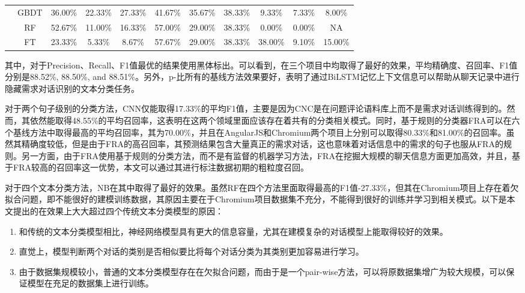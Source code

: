 \begin{table}[htb]
\begin{tabular}{|c|c|c|c|c|c|c|c|c|c|c|}
                                     & GBDT      & 36.00\%          & 22.33\%          & 27.33\%          & 41.67\%          & 35.67\%          & 38.33\%          & 9.33\%           & 7.33\%           & 8.00\%           \\ \cline{2-11} 
                                     & RF        & 52.67\%          & 11.00\%          & 16.33\%          & 57.00\%          & 29.00\%          & 38.33\%          & 0.00\%           & 0.00\%           & NA               \\ \cline{2-11} 
                                     & FT        & 23.33\%          & 5.33\%           & 8.67\%           & 57.67\%          & 29.00\%          & 38.33\%          & 38.00\%          & 9.10\%           & 15.00\%          \\ \hline
\end{tabular}
\end{table}

其中，对于Precision、Recall、F1值最优的结果使用黑体标出。可以看到，{\tool}在三个项目中均取得了最好的效果，平均精确度、召回率、F1值分别是88.52\%, 88.50\%, and 88.51\%。另外，p-{\tool}比所有的基线方法效果要好，表明了通过BiLSTM记忆上下文信息可以帮助从聊天记录中进行隐藏需求对话识别的文本分类任务。

对于两个句子级别的分类方法，CNN仅能取得17.33\%的平均F1值，主要是因为CNC是在问题评论语料库上而不是需求对话训练得到的。然而，其依然能取得48.55\%的平均召回率，这表明在这两个领域里面应该存在着共有的分类相关模式。同时，基于规则的分类器FRA可以在六个基线方法中取得最高的平均召回率，其为70.00\%，并且在AngularJS和Chromium两个项目上分别可以取得80.33\%和81.00\%的召回率。虽然其精确度较低，但是由于FRA的高召回率，其预测结果包含大量真正的需求对话，这也意味着对话信息中的需求的句子也服从FRA的规则。另一方面，由于FRA使用基于规则的分类方法，而不是有监督的机器学习方法，FRA在挖掘大规模的聊天信息方面更加高效，并且，基于FRA较高的召回率这一优势，本文可以通过其进行标注数据初期的粗粒度召回。

对于四个文本分类方法，NB在其中取得了最好的效果。虽然RF在四个方法里面取得最高的F1值-27.33\%，但其在Chromium项目上存在着欠拟合问题，即不能很好的建模训练数据，其原因主要在于Chromium项目数据集不充分，不能得到很好的训练并学习到相关模式。以下是本文提出的{\tool}在效果上大大超过四个传统文本分类模型的原因：
\begin{enumerate}
    \item 和传统的文本分类模型相比，神经网络模型具有更大的信息容量，尤其在建模复杂的对话模型上能取得较好的效果。
    \item 直觉上，模型判断两个对话的类别是否相似要比将每个对话分类为其类别更加容易进行学习。
    \item 由于数据集规模较小，普通的文本分类模型存在在欠拟合问题，而由于{\tool}是一个pair-wise方法，可以将原数据集增广为较大规模，可以保证模型在充足的数据集上进行训练。
\end{enumerate}

